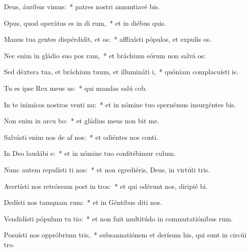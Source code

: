 \item Deus, áuribus  vimus:~* patres nostri annuntiavé bis.
\item Opus, quod operátus es in di rum,~* et in diébus quis.
\item Manus tua gentes dispérdidit, et  os:~* afflixísti pópulos, et expulís os.
\item Nec enim in gládio suo pos ram,~* et bráchium eórum non salvá os:
\item Sed déxtera tua, et bráchium tuum, et illumináti  i,~* quóniam complacuísti  is.
\item Tu es ipse Rex meus   us:~* qui mandas salú cob.
\item In te inimícos nostros venti nu:~* et in nómine tuo spernémus insurgéntes  bis.
\item Non enim in arcu  bo:~* et gládius meus non bit me.
\item Salvásti enim nos de af nos:~* et odiéntes nos conti.
\item In Deo laudábi  e:~* et in nómine tuo confitébimur  culum.
\item Nunc autem repulísti  ti nos:~* et non egrediéris, Deus, in virtúti tris.
\item Avertísti nos retrórsum post in tros:~* et qui odérunt nos, diripié bi.
\item Dedísti nos tamquam  rum:~* et in Géntibus diti nos.
\item Vendidísti pópulum tu  tio:~* et non fuit multitúdo in commutatiónibus rum.
\item Posuísti nos oppróbrium  tris,~* subsannatiónem et derísum his, qui sunt in circúi tro.
